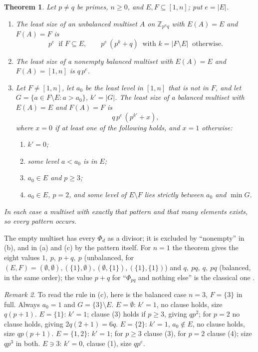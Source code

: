 \documentclass[11pt,a4paper]{amsart}
\newtheorem{theorem}{Theorem}
\theoremstyle{definition}
\theoremstyle{remark}
\newtheorem{remark}[theorem]{Remark}
\newcommand{\Z}{\mathbb{Z}}
\begin{document}
\begin{theorem}\label{thm:main}
Let $p\ne q$ be primes, $n\ge 0$, and $E,F\subseteq[1,n]$; put $e=|E|$.
\begin{enumerate}
\item[(a)] The least size of an unbalanced multiset $A$ on $\Z_{p^nq}$ with $E(A)=E$ and $F(A)=F$ is
\[ p^{e}\ \text{ if } F\subseteq E,\qquad p^{e}\,(p^{k}+q)\ \text{ with } k=|F\setminus E|\ \text{ otherwise.} \]
\item[(b)] The least size of a nonempty balanced multiset with $E(A)=E$ and $F(A)=[1,n]$ is $q\,p^{e}$.
\item[(c)] Let $F\ne[1,n]$, let $a_0$ be the least level in $[1,n]$ that is not in $F$, and let
$G=\{a\in F\setminus E:a>a_0\}$, $k'=|G|$. The least size of a balanced multiset with $E(A)=E$ and
$F(A)=F$ is \[ q\,p^{e}\,(p^{k'}+x), \] where $x=0$ if at least one of the following holds, and $x=1$
otherwise:
 \begin{enumerate}
 \item[(1)] $k'=0$;
 \item[(2)] some level $a<a_0$ is in $E$;
 \item[(3)] $a_0\in E$ and $p\ge 3$;
 \item[(4)] $a_0\in E$, $p=2$, and some level of $E\setminus F$ lies strictly between $a_0$ and $\min G$.
 \end{enumerate}
\end{enumerate}
In each case a multiset with exactly that pattern and that many elements exists, so every pattern occurs.
\end{theorem}

The empty multiset has every $\Phi_d$ as a divisor; it is excluded by ``nonempty'' in (b), and in (a) and
(c) by the pattern itself. For $n=1$ the theorem gives the eight values
$1,\ p,\ p+q,\ p$ (unbalanced, for $(E,F)=(\emptyset,\emptyset),(\{1\},\emptyset),(\emptyset,\{1\}),(\{1\},\{1\})$)
and $q,\ pq,\ q,\ pq$ (balanced, in the same order); the value $p+q$ for ``$\Phi_{pq}$ and nothing
else'' is the classical one \cite{LL}. 
\begin{remark}\label{rem:example}
To read the rule in (c), here is the balanced case $n=3$, $F=\{3\}$ in full. Always $a_0=1$ and $G=\{3\}\setminus E$.
$E=\emptyset$: $k'=1$, no clause holds, size $q(p+1)$. $E=\{1\}$: $k'=1$; clause (3) holds if $p\ge 3$, giving
$qp^2$; for $p=2$ no clause holds, giving $2q(2+1)=6q$. $E=\{2\}$: $k'=1$, $a_0\notin E$, no clause holds,
size $qp(p+1)$. $E=\{1,2\}$: $k'=1$; for $p\ge3$ clause (3), for $p=2$ clause (4); size $qp^3$ in both.
$E\ni 3$: $k'=0$, clause (1), size $qp^{e}$.
\end{remark}
\end{document}
